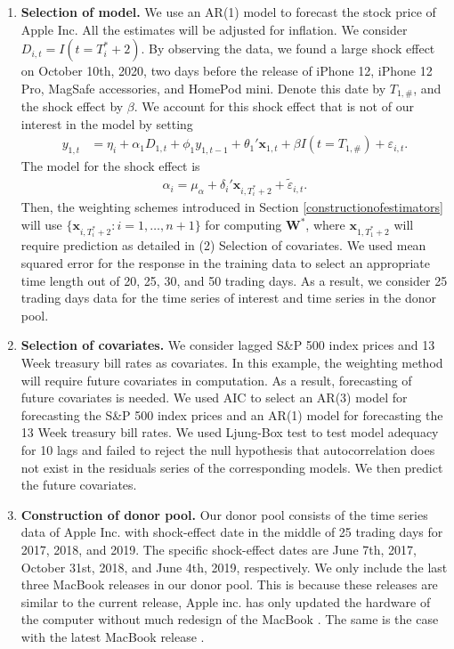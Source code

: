\documentclass[11pt,3p,review,authoryear]{elsarticle}
\theoremstyle{definition}
\begin{document}
\begin{enumerate}[label = (\arabic*)]
  \item \textbf{Selection of model.}  We use an AR(1) model to forecast the stock price of Apple Inc. All the estimates will be adjusted for inflation.  We consider $D_{i, t} = I(t = T_i^*+2)$. By observing  the data, we found a large shock effect on October 10th, 2020, two days before the release of iPhone 12, iPhone 12 Pro, MagSafe accessories, and HomePod mini. Denote this date by $T_{1,\#}$, and the shock effect by $\beta$. We account for this shock effect that is not of our interest in the model by setting 
  \begin{align*}
    y_{1,t} &= \eta_i + \alpha_1 D_{1,t} +\phi_1y_{1, t-1}+\theta_1'\mathbf{x}_{1,t} + \beta I(t = T_{1,\#}) + \varepsilon_{i,t}.
  \end{align*}
  The model for the shock effect is
  \begin{align*}
    \alpha_i = \mu_{\alpha} + \delta_i'\mathbf{x}_{i,T_i^*+2}  + \tilde{\varepsilon}_{i,t}.
  \end{align*}
  Then, the weighting schemes introduced in Section \ref{constructionofestimators} will use  $\{\mathbf{x}_{i,T_i^*+2} \colon i = 1, \ldots, n+1\}$ for computing $\mathbf{W}^*$, where $\mathbf{x}_{1, T_1^*+2}$ will require prediction as detailed in (2) Selection of covariates. We used mean squared error for the response in the training data to select an appropriate time length out of 20, 25, 30, and 50 trading days. As a result, we consider 25 trading days data for the time series of interest and time series in the donor pool. 
  \item \textbf{Selection of covariates.} We consider lagged  S\&P 500 index prices and 13 Week treasury bill rates as covariates. In this example, the weighting method will require future covariates in computation. As a result, forecasting of future covariates is needed. We used AIC to select an AR(3) model for forecasting the S\&P 500 index prices and an AR(1)   model for forecasting the 13 Week treasury bill rates. We used Ljung-Box test to test  model adequacy for 10 lags and failed to reject the null hypothesis that autocorrelation does not exist in the residuals series of the corresponding models. We then predict the future covariates.
  \item \textbf{Construction of donor pool.} Our donor pool consists of the time series data of Apple Inc. with shock-effect date in the middle of 25 trading days for 2017, 2018, and 2019.  The specific shock-effect dates are June 7th, 2017, October 31st, 2018, and June 4th, 2019, respectively. We only include the last three MacBook releases in our donor pool. This is because these releases are similar to the current release, Apple inc. has only updated the hardware of the computer without much redesign of the MacBook \citep{apple2017, apple2018, apple2019}. The same is the case with the latest MacBook release \citep{apple2020}.  %
\end{enumerate}
\end{document}
